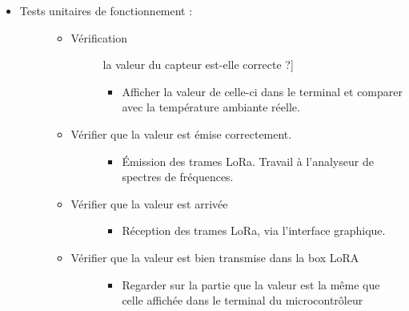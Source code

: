 \documentclass[letterpaper,10pt,french]{sphinxmanual}
\begin{document}
\begin{itemize}
\begin{itemize}
\begin{description}
\begin{itemize}
\end{itemize}

\end{description}

\end{itemize}

\item {} \begin{description}
\item[{Tests unitaires de fonctionnement :}] \leavevmode\begin{itemize}
\item {} \begin{description}
\item[{Vérification}] \leavevmode{[}la valeur du capteur est-elle correcte ?{]}\begin{itemize}
\item {} 
Afficher la valeur de celle-ci dans le terminal et comparer avec la température ambiante réelle.

\end{itemize}

\end{description}

\item {} \begin{description}
\item[{Vérifier que la valeur est émise correctement.}] \leavevmode\begin{itemize}
\item {} 
Émission des trames LoRa. Travail à l’analyseur de spectres de fréquences.

\end{itemize}

\end{description}

\item {} \begin{description}
\item[{Vérifier que la valeur est arrivée}] \leavevmode\begin{itemize}
\item {} 
Réception des trames LoRa, via l’interface graphique.

\end{itemize}

\end{description}

\item {} \begin{description}
\item[{Vérifier que la valeur est bien transmise dans la box LoRA}] \leavevmode\begin{itemize}
\item {} 
Regarder sur la partie  que la valeur est la même que celle affichée dans le terminal du microcontrôleur


\end{itemize}
\end{description}
\end{itemize}
\end{description}
\end{itemize}
\end{document}
